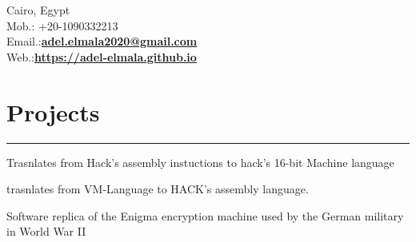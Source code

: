 \documentclass[]{rahulworld-resume}
\begin{document}
\begin{minipage}[t]{0.66\textwidth} 
\hspace*{0pt}\hfill    \\
\hspace*{0pt}\hfill    \\
\hspace*{0pt}\hfill Cairo, Egypt \\
\hspace*{0pt}\hfill Mob.: +20-1090332213 \\
\hspace*{0pt}\hfill Email.:\textbf{\href{adel.elmala2020@gmail.com}{adel.elmala2020@gmail.com}} \\
\hspace*{0pt}\hfill Web.:\textbf{\href{https://adel-elmala.github.io}{https://adel-elmala.github.io}} 
\section{Projects}
\noindent\rule{12.5cm}{0.4pt}
 
\noindent
\hspace{5em}%
\begin{minipage}{0.85\textwidth\vspace{2pt}}
Trasnlates from Hack's assembly instuctions to hack's 16-bit Machine language
\end{minipage}
\sectionsep

 
\noindent
\hspace{5em}%
\begin{minipage}{0.85\textwidth\vspace{2pt}}trasnlates from VM-Language to HACK's assembly language. 
\end{minipage}
\sectionsep

 
\noindent
\hspace{5em}%
\begin{minipage}{0.85\textwidth\vspace{2pt}}Software replica of the Enigma encryption machine used by the German military in World War II
\end{minipage}
\sectionsep


\end{minipage}
\end{document}
